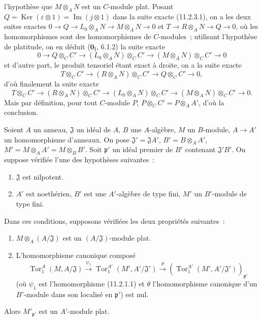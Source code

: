 
l'hypothèse que $M\otimes_AN$ est un $C$-module plat. Posant
$Q=\operatorname{Ker}(\varepsilon\otimes1)=\operatorname{Im}(j\otimes1)$
dans la suite exacte (11.2.3.1), on a les deux suites exactes
$0\to Q\to L_0\otimes_AN\to M\otimes_AN\to0$ et
$T\to R\otimes_AN\to Q\to0$, où les homomorphismes sont des homomorphismes
de $C$-modules~; utilisant l'hypothèse de platitude, on en déduit
($\mathbf 0_{\mathrm I}$, 6.1.2) la suite exacte
\[
0\to Q\otimes_CC'\to(L_0\otimes_AN)\otimes_CC'
\to(M\otimes_AN)\otimes_CC'\to0
\]
et d'autre part, le produit tensoriel étant exact à droite, on a la suite
exacte
\[
T\otimes_CC'\to(R\otimes_AN)\otimes_CC'\to Q\otimes_CC'\to0,
\]
d'où finalement la suite exacte
\[
T\otimes_CC'\to(R\otimes_AN)\otimes_CC'\to
(L_0\otimes_AN)\otimes_CC'\to(M\otimes_AN)\otimes_CC'\to0.
\]
Mais par définition, pour tout $C$-module $P$,
$P\otimes_CC'=P\otimes_AA'$, d'où la conclusion.

\begin{lemma}[11.2.5]
\label{IV.11.2.5-fr}
Soient $A$ un anneau, $\mathfrak J$ un idéal de $A$, $B$ une $A$-algèbre,
$M$ un $B$-module, $A\to A'$ un homomorphisme d'anneaux. On pose
$\mathfrak J'=\mathfrak JA'$, $B'=B\otimes_AA'$,
$M'=M\otimes_AA'=M\otimes_BB'$. Soit $\mathfrak p'$ un idéal premier de
$B'$ contenant $\mathfrak J'B'$. On suppose vérifiée l'une des hypothèses
suivantes~:
\begin{enumerate}[label=\emph{\alph*)}]
\item $\mathfrak J$ est nilpotent.
\item $A'$ est noethérien, $B'$ est une $A'$-algèbre de type fini, $M'$ un
$B'$-module de type fini.
\end{enumerate}
Dans ces conditions, supposons vérifiées les deux propriétés suivantes~:
\begin{enumerate}[label=\emph{(\roman*)}]
\item $M\otimes_A(A/\mathfrak J)$ est un $(A/\mathfrak J)$-module plat.
\item L'homomorphisme canonique composé
\[
\operatorname{Tor}_1^A(M,A/\mathfrak J)\xrightarrow{\psi_1}
\operatorname{Tor}_1^{A'}(M',A'/\mathfrak J')\xrightarrow{\theta}
(\operatorname{Tor}_1^{A'}(M',A'/\mathfrak J'))_{\mathfrak p'}
\]
(où $\psi_1$ est l'homomorphisme (11.2.1.1) et $\theta$ l'homomorphisme
canonique d'un $B'$-module dans son localisé en $\mathfrak p'$) est nul.
\end{enumerate}
Alors $M'_{\mathfrak p'}$ est un $A'$-module plat.
\end{lemma}

